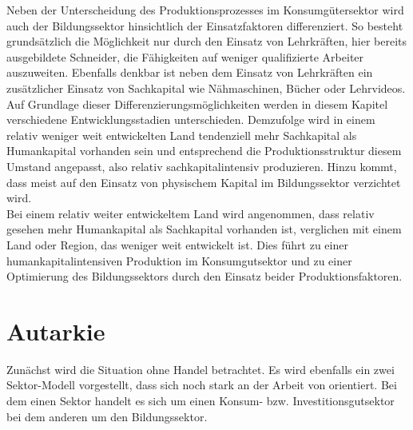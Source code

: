 Neben der Unterscheidung des Produktionsprozesses im Konsumgütersektor wird auch der Bildungssektor hinsichtlich der Einsatzfaktoren differenziert. So besteht grundsätzlich die Möglichkeit nur durch den Einsatz von Lehrkräften, hier bereits ausgebildete Schneider, die Fähigkeiten auf weniger qualifizierte Arbeiter auszuweiten. 
Ebenfalls denkbar ist neben dem Einsatz von Lehrkräften ein zusätzlicher Einsatz von Sachkapital wie Nähmaschinen, Bücher oder Lehrvideos.\\
%
Auf Grundlage dieser Differenzierungsmöglichkeiten werden in diesem Kapitel verschiedene Entwicklungsstadien unterschieden. Demzufolge wird in einem relativ weniger weit entwickelten Land tendenziell mehr Sachkapital als Humankapital vorhanden sein und entsprechend die Produktionsstruktur diesem Umstand angepasst, also relativ sachkapitalintensiv produzieren. Hinzu kommt, dass meist auf den Einsatz von physischem Kapital im Bildungssektor verzichtet wird.\\
%
Bei einem relativ weiter entwickeltem Land wird angenommen, dass relativ gesehen mehr Humankapital als Sachkapital vorhanden ist, verglichen mit einem Land oder Region, das weniger weit entwickelt ist. Dies führt zu einer humankapitalintensiven Produktion im Konsumgutsektor und zu einer Optimierung des Bildungssektors durch den Einsatz beider Produktionsfaktoren. 

\section{Autarkie}
Zunächst wird die Situation ohne Handel betrachtet. Es wird ebenfalls ein zwei Sektor-Modell vorgestellt, dass sich noch stark an der Arbeit von \cite{Lucas.1988} orientiert. Bei dem einen Sektor handelt es sich um einen Konsum- bzw. Investitionsgutsektor bei dem anderen um den Bildungssektor.
%
